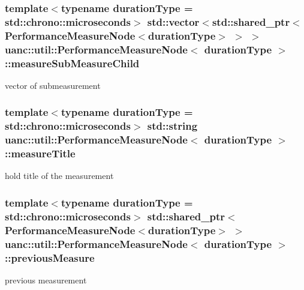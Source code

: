 \subsubsection[{\texorpdfstring{measure\+Sub\+Measure\+Child}{measureSubMeasureChild}}]{\setlength{\rightskip}{0pt plus 5cm}template$<$typename duration\+Type  = std\+::chrono\+::microseconds$>$ std\+::vector$<$std\+::shared\+\_\+ptr$<${\bf Performance\+Measure\+Node}$<$duration\+Type$>$ $>$ $>$ {\bf uanc\+::util\+::\+Performance\+Measure\+Node}$<$ duration\+Type $>$\+::measure\+Sub\+Measure\+Child}\hypertarget{classuanc_1_1util_1_1_performance_measure_node_a226829aeae0cbf90d0ec0fe05b486431}{}\label{classuanc_1_1util_1_1_performance_measure_node_a226829aeae0cbf90d0ec0fe05b486431}
vector of submeasurement 
\subsubsection[{\texorpdfstring{measure\+Title}{measureTitle}}]{\setlength{\rightskip}{0pt plus 5cm}template$<$typename duration\+Type  = std\+::chrono\+::microseconds$>$ std\+::string {\bf uanc\+::util\+::\+Performance\+Measure\+Node}$<$ duration\+Type $>$\+::measure\+Title}\hypertarget{classuanc_1_1util_1_1_performance_measure_node_aade3a613184f260d27b6ee46eebcaee6}{}\label{classuanc_1_1util_1_1_performance_measure_node_aade3a613184f260d27b6ee46eebcaee6}
hold title of the measurement 
\subsubsection[{\texorpdfstring{previous\+Measure}{previousMeasure}}]{\setlength{\rightskip}{0pt plus 5cm}template$<$typename duration\+Type  = std\+::chrono\+::microseconds$>$ std\+::shared\+\_\+ptr$<${\bf Performance\+Measure\+Node}$<$duration\+Type$>$ $>$ {\bf uanc\+::util\+::\+Performance\+Measure\+Node}$<$ duration\+Type $>$\+::previous\+Measure}\hypertarget{classuanc_1_1util_1_1_performance_measure_node_a32e4f3a9afcee94d9ea000ea66c3dbd2}{}\label{classuanc_1_1util_1_1_performance_measure_node_a32e4f3a9afcee94d9ea000ea66c3dbd2}
previous measurement 
